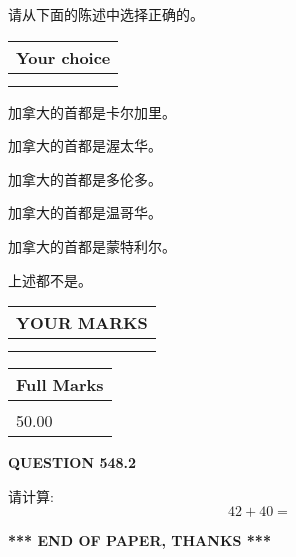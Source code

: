 \documentclass{ctexart}
\begin{document}
  
请从下面的陈述中选择正确的。
  
  
\noindent\hspace{3.0in} \begin{tabular}{|l|}
\hline
Your choice \\
\hline
 \\ 
 \\ 
\hline
\end{tabular}
  
  
 
 
加拿大的首都是卡尔加里。
 
 
加拿大的首都是渥太华。
 
 
加拿大的首都是多伦多。
 
 
加拿大的首都是温哥华。
 
 
加拿大的首都是蒙特利尔。
 
 
 上述都不是。
 
 
  
\vspace{0.2in}
  
\noindent\begin{tabular}{|l|}
\hline
 YOUR MARKS  \\
\hline
 \\ 
 \\ 
\hline
\end{tabular}
\hspace{0.05in} \begin{tabular}{|l|}
\hline
 Full Marks  \\
\hline
 \\ 
50.00 \\
\hline
\end{tabular}
{\textbf{\Large{QUESTION
548.2 
}}}
  
  
 
请计算:
\begin{equation}
42 +  %
40 = \nonumber
\end{equation}
 

 

 
   
   
 \vspace{0.2in}
 
   
   
   
   
\vspace{1.0in} 
{\textbf{\large{ *** END OF PAPER, THANKS *** }}} 
   
\end{document}
